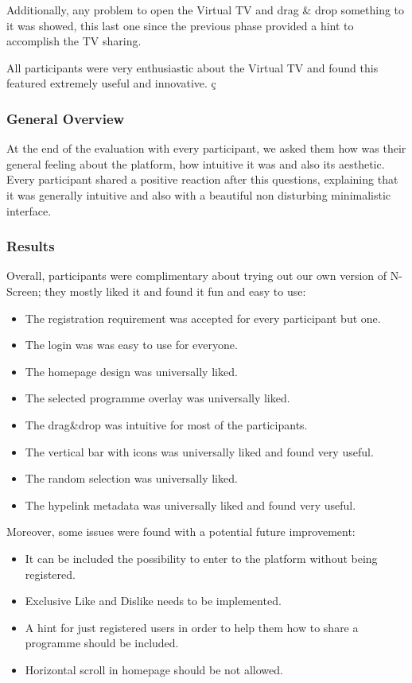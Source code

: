 \documentclass{acm_proc_article-sp}
\begin{document}
Additionally, any problem to open the Virtual TV and drag \& drop something to it was showed, this last one since the previous phase provided a hint to accomplish the TV sharing.

All participants were very enthusiastic about the Virtual TV and found this featured extremely useful and innovative. ç

\subsubsection{General Overview}

At the end of the evaluation with every participant, we asked them how was their general feeling about the platform, how intuitive it was and also its aesthetic. Every participant shared a positive reaction after this questions, explaining that it was generally intuitive and also with a beautiful non disturbing minimalistic interface.  

\subsubsection{Results}

Overall, participants were complimentary about trying out our own version of N-Screen; they mostly liked it and found it fun and easy to use:

\begin{itemize}
	\item The registration requirement was accepted for every participant but one. 
	\item The login was was easy to use for everyone. 
	\item The homepage design was universally liked. 
	\item The selected programme overlay was universally liked. 
	\item The drag\&drop was intuitive for most of the participants. 
	\item The vertical bar with icons was universally liked and found very useful.
	\item The random selection was universally liked.
	\item The hypelink metadata was universally liked and found very useful. 
\end{itemize}

Moreover, some issues were found with a potential future improvement: 

\begin{itemize}
	\item It can be included the possibility to enter to the platform without being registered. 
	\item Exclusive Like and Dislike needs to be implemented. 
	\item A hint for just registered users in order to help them how to share a programme should be included. 
	\item Horizontal scroll in homepage should be not allowed.
\end{itemize}
\end{document}
